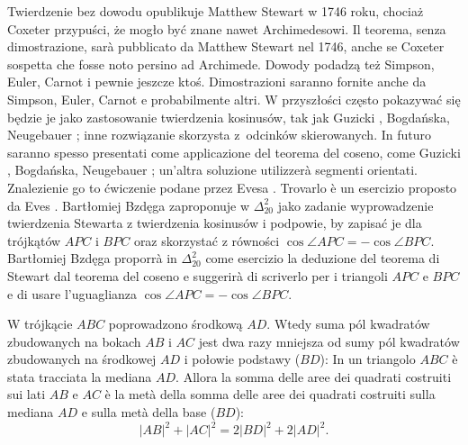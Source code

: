Twierdzenie bez dowodu opublikuje Matthew Stewart w 1746 roku, chociaż Coxeter przypuści, że mogło być znane nawet Archimedesowi. %
Il teorema, senza dimostrazione, sarà pubblicato da Matthew Stewart nel 1746, anche se Coxeter sospetta che fosse noto persino ad Archimede. %
%
%
Dowody podadzą też Simpson, Euler, Carnot i pewnie jeszcze ktoś. %
Dimostrazioni saranno fornite anche da Simpson, Euler, Carnot e probabilmente altri. %
%
%
%
W przyszłości często pokazywać się będzie je jako zastosowanie twierdzenia kosinusów, tak jak Guzicki \cite[s. 265]{guzicki_2021}, Bogdańska, Neugebauer \cite[s. 90-91]{neugebauer_2018}; inne rozwiązanie skorzysta z~odcinków skierowanych. %
In futuro saranno spesso presentati come applicazione del teorema del coseno, come Guzicki \cite[s. 265]{guzicki_2021}, Bogdańska, Neugebauer \cite[s. 90-91]{neugebauer_2018}; un'altra soluzione utilizzerà segmenti orientati. %
Znalezienie go to ćwiczenie podane przez Evesa \cite[s. 58]{eves1_1972}. %
Trovarlo è un esercizio proposto da Eves \cite[s. 58]{eves1_1972}. %
Bartłomiej Bzdęga zaproponuje w $\Delta_{20}^{2}$ jako zadanie wyprowadzenie twierdzenia Stewarta z twierdzenia kosinusów i podpowie, by zapisać je dla trójkątów $APC$ i $BPC$ oraz skorzystać z równości $\cos \angle APC = -\cos \angle BPC$. %
Bartłomiej Bzdęga proporrà in $\Delta_{20}^{2}$ come esercizio la deduzione del teorema di Stewart dal teorema del coseno e suggerirà di scriverlo per i triangoli $APC$ e $BPC$ e di usare l'uguaglianza $\cos \angle APC = -\cos \angle BPC$. %

\begin{corollary}
[twierdzenie Apoloniusza] %
[teorema di Apollonio] %
	W trójkącie $ABC$ poprowadzono środkową $AD$. %
	Wtedy suma pól kwadratów zbudowanych na bokach $AB$ i $AC$ jest dwa razy mniejsza od sumy pól kwadratów zbudowanych na środkowej $AD$ i połowie podstawy ($BD$): %
	In un triangolo $ABC$ è stata tracciata la mediana $AD$. %
	Allora la somma delle aree dei quadrati costruiti sui lati $AB$ e $AC$ è la metà della somma delle aree dei quadrati costruiti sulla mediana $AD$ e sulla metà della base ($BD$): %
	\begin{equation}
		|AB|^2 + |AC|^2 = 2|BD|^2 + 2 |AD|^2.
	\end{equation}
\end{corollary}

